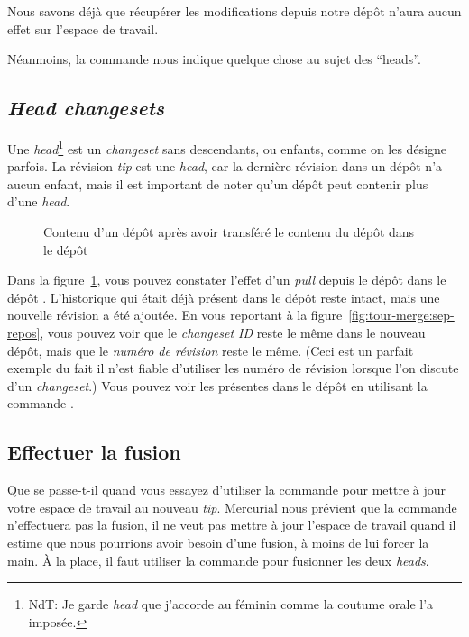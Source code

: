 Nous savons déjà que récupérer les modifications depuis notre dépôt 
 n'aura aucun effet sur l'espace de travail.


Néanmoins, la commande  nous indique quelque chose au 
sujet des ``heads''.

\subsection{\textit{Head changesets}} %

Une \textit{head}\footnote{NdT: Je garde \textit{head} que j'accorde 
au féminin comme la coutume orale l'a imposée.} est un \textit{changeset} 
sans descendants, ou enfants, comme on les désigne parfois. La révision 
\textit{tip} est une \textit{head}, car la dernière révision dans un dépôt 
n'a aucun enfant, mais il est important de noter qu'un dépôt peut contenir 
plus d'une \textit{head}.

\begin{figure}[ht]
  \centering
  \caption{Contenu d'un dépôt après avoir transféré le contenu du dépôt 
     dans le dépôt }
  \label{fig:tour-merge:pull}
\end{figure}

Dans la figure~\ref{fig:tour-merge:pull}, vous pouvez constater l'effet
d'un \textit{pull} depuis le dépôt  dans le dépôt 
. L'historique qui était déjà présent dans le dépôt
 reste intact, mais une nouvelle révision a été 
ajoutée. En vous reportant à la figure~\ref{fig:tour-merge:sep-repos},
vous pouvez voir que le \textit{\emph{changeset ID}} reste le même dans
le nouveau dépôt, mais que le \emph{numéro de révision} reste le même.
(Ceci est un parfait exemple du fait il n'est fiable d'utiliser les
numéro de révision lorsque l'on discute d'un \textit{changeset}.) Vous
pouvez voir les  présentes dans le dépôt en utilisant la 
commande .

\subsection{Effectuer la fusion}

Que se passe-t-il quand vous essayez d'utiliser la commande  
pour mettre à jour votre espace de travail au nouveau \textit{tip}.
Mercurial nous prévient que la commande  n'effectuera pas
la fusion, il ne veut pas mettre à jour l'espace de travail quand il 
estime que nous pourrions avoir besoin d'une fusion, à moins de lui
forcer la main. À la place, il faut utiliser la commande 
pour fusionner les deux \textit{heads}.

